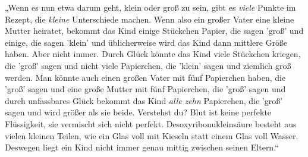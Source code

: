 „Wenn es nun etwa darum geht, klein oder groß zu sein, gibt es \emph{viele} Punkte im Rezept, die \emph{kleine} Unterschiede machen. Wenn also ein großer Vater eine kleine Mutter heiratet, bekommt das Kind einige Stückchen Papier, die sagen 'groß' und einige, die sagen 'klein' und üblicherweise wird das Kind dann mittlere Größe haben. Aber nicht immer. Durch Glück könnte das Kind viele Stückchen kriegen, die 'groß' sagen und nicht viele Papierchen, die 'klein' sagen und ziemlich groß werden. Man könnte auch einen großen Vater mit fünf Papierchen haben, die 'groß' sagen und eine große Mutter mit fünf Papierchen, die 'groß' sagen und durch unfassbares Glück bekommt das Kind \emph{alle zehn} Papierchen, die 'groß' sagen und wird größer als sie beide. Verstehst du? Blut ist keine perfekte Flüssigkeit, sie vermischt sich nicht perfekt. Desoxyribonukleinsäure besteht aus vielen kleinen Teilen, wie ein Glas voll mit Kieseln statt einem Glas voll Wasser. Deswegen liegt ein Kind nicht immer genau mittig zwischen seinen Eltern.“


